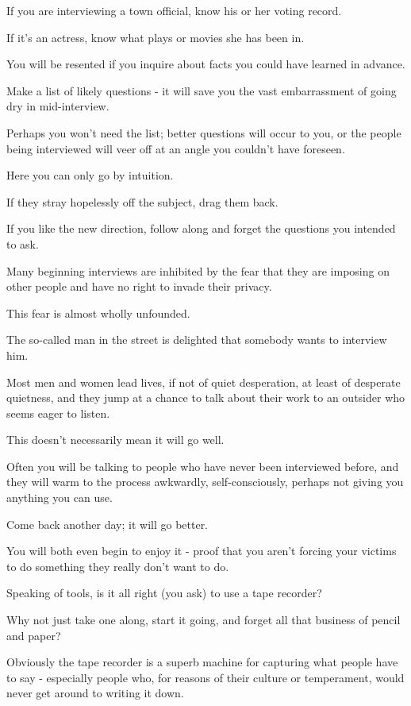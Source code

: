 \documentclass{book}
\numberwithin{equation}{section}
\begin{document}
If you are interviewing a town official, know his or her voting record.

If it's an actress, know what plays or movies she has been in.

You will be resented if you inquire about facts you could have learned in advance.

Make a list of likely questions - it will save you the vast embarrassment of going dry in mid-interview.

Perhaps you won't need the list; better questions will occur to you, or the people being interviewed will veer off at an angle you couldn't have foreseen.

Here you can only go by intuition.

If they stray hopelessly off the subject, drag them back.

If you like the new direction, follow along and forget the questions you intended to ask.

%
Many beginning interviews are inhibited by the fear that they are imposing on other people and have no right to invade their privacy.

This fear is almost wholly unfounded.

The so-called man in the street is delighted that somebody wants to interview him.

Most men and women lead lives, if not of quiet desperation, at least of desperate quietness, and they jump at a chance to talk about their work to an outsider who seems eager to listen.

%
This doesn't necessarily mean it will go well.

Often you will be talking to people who have never been interviewed before, and they will warm to the process awkwardly, self-consciously, perhaps not giving you anything you can use.

Come back another day; it will go better.

You will both even begin to enjoy it - proof that you aren't forcing your victims to do something they really don't want to do.

%
Speaking of tools, is it all right (you ask) to use a tape recorder?

Why not just take one along, start it going, and forget all that business of pencil and paper?

%
Obviously the tape recorder is a superb machine for capturing what people have to say - especially people who, for reasons of their culture or temperament, would never get around to writing it down.
\end{document}
